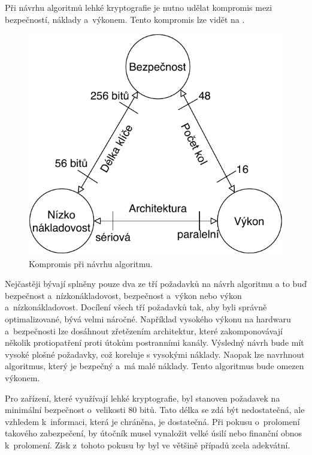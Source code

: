 Při návrhu algoritmů lehké kryptografie je nutno udělat kompromis mezi bezpečností, náklady a~výkonem. Tento kompromis lze vidět na . 
\begin{figure}[!h]
  \begin{center}
    \includegraphics[scale=0.7]{obrazky/designTradeOFF.pdf}
  \end{center}
  \caption[Kompromis při návrhu algoritmu]{Kompromis při návrhu algoritmu.\cite{PoschmannCrypto}}
  \label{img:Compromis}
\end{figure}

Nejčastěji bývají splněny pouze dva ze tří požadavků na návrh algoritmu a to buď bezpečnost a~nízkonákladovost, bezpečnost a~výkon nebo výkon a~nízkonákladovost. Docílení všech tří požadavků tak, aby byli správně optimalizované, bývá velmi náročné. Například vysokého výkonu na hardwaru a~bezpečnosti lze dosáhnout zřetězením architektur, které zakomponovávají několik protiopatření proti útokům postranními kanály. Výsledný návrh bude mít vysoké plošné požadavky, což koreluje s vysokými náklady. Naopak lze navrhnout algoritmus, který je bezpečný a~má malé náklady. Tento algoritmus bude omezen výkonem.\cite{PoschmannCrypto}

Pro zařízení, které využívají lehké kryptografie, byl stanoven požadavek na minimální bezpečnost o~velikosti 80 bitů. Tato délka se zdá být nedostatečná, ale vzhledem k~informaci, která je chráněna, je dostatečná. Při pokusu o~prolomení takového zabezpečení, by útočník musel vynaložit velké úsilí nebo finanční obnos k~prolomení. Zisk z~tohoto pokusu by byl ve většině případů zcela adekvátní.\cite{Klima}

